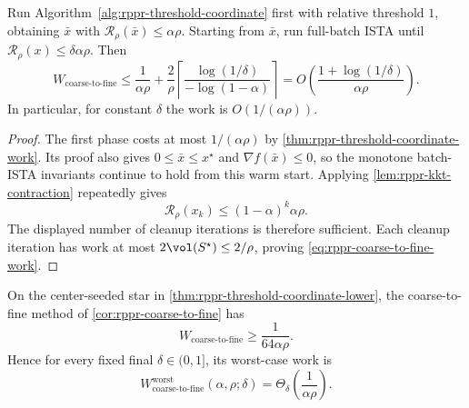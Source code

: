 \begin{corollary}
\label{cor:rppr-coarse-to-fine}
Run Algorithm~\ref{alg:rppr-threshold-coordinate} first with relative
threshold \(1\), obtaining \(\bar{x}\) with
\(\mathcal{R}_\rho(\bar{x})\leq\alpha\rho\).  Starting from \(\bar{x}\), run
full-batch ISTA until
\(\mathcal{R}_\rho(x)\leq\delta\alpha\rho\).  Then
\begin{equation}
    W_{\mathrm{coarse\mbox{-}to\mbox{-}fine}
    }
    \leq
    \frac{1}{\alpha\rho}
    +
    \frac{2}{\rho}
    \left\lceil
        \frac{\log(1/\delta)}{-\log(1-\alpha)}
    \right\rceil
    =
    O\left(
        \frac{1+\log(1/\delta)}{\alpha\rho}
    \right).
    \label{eq:rppr-coarse-to-fine-work}
\end{equation}
In particular, for constant \(\delta\) the work is
\(O(1/(\alpha\rho))\).
\end{corollary}

\begin{proof}
The first phase costs at most \(1/(\alpha\rho)\) by
\cref{thm:rppr-threshold-coordinate-work}.  Its proof also gives
\(0\leq\bar{x}\leq x^\star\) and \(\nabla f(\bar{x})\leq0\), so the monotone
batch-ISTA invariants continue to hold from this warm start.  Applying
\cref{lem:rppr-kkt-contraction} repeatedly gives
\[
    \mathcal{R}_\rho(x_k)
    \leq(1-\alpha)^k\alpha\rho.
\]
The displayed number of cleanup iterations is therefore sufficient.  Each
cleanup iteration has work at most \(2\vol(S^\star)\leq2/\rho\), proving
\cref{eq:rppr-coarse-to-fine-work}.
\end{proof}

\begin{corollary}
\label{cor:rppr-coarse-to-fine-tight}
On the center-seeded star in
\cref{thm:rppr-threshold-coordinate-lower}, the coarse-to-fine method of
\cref{cor:rppr-coarse-to-fine} has
\begin{equation}
    W_{\mathrm{coarse\mbox{-}to\mbox{-}fine}}
    \geq\frac{1}{64\alpha\rho}.
    \label{eq:rppr-coarse-to-fine-lower}
\end{equation}
Hence for every fixed final \(\delta\in(0,1]\), its worst-case work is
\begin{equation}
    W_{\mathrm{coarse\mbox{-}to\mbox{-}fine}}^{\mathrm{worst}}
    (\alpha,\rho;\delta)
    =\Theta_\delta\!\left(\frac1{\alpha\rho}\right).
    \label{eq:rppr-coarse-to-fine-tight}
\end{equation}
\end{corollary}

